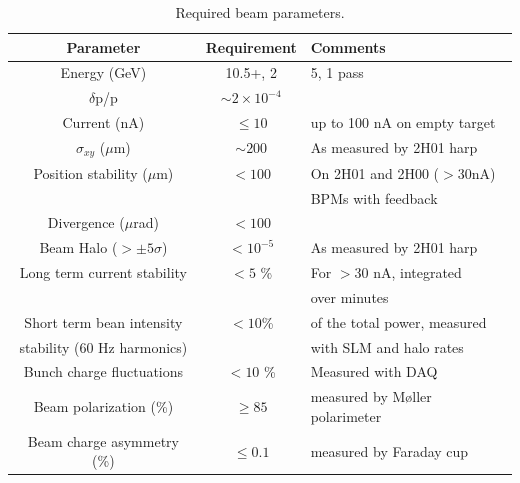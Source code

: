\documentclass[12pt]{article}
\begin{document}
 \begin{table}[htb]
\caption{Required beam parameters.}\label{tab:beam_par}
\centering
 \begin{tabular}{|c|c|l|}
\hline
Parameter & Requirement &Comments \\ \hline 
Energy (GeV) & 10.5+, 2   & 5, 1 pass  \\  \hline
$\delta$p/p & $\sim 2\times 10^{-4}$ & \\ \hline 
Current (nA) & $\le 10$ &up to 100 nA on empty target  \\  \hline
$\sigma_{xy}$ ($\mu$m) &$ \sim 200$& As measured by 2H01 harp \\ \hline 
Position stability ($\mu$m) & $< 100$ & On 2H01 and 2H00 ($>30$nA) \\ 
&&BPMs with feedback \\ \hline
Divergence ($\mu$rad) & $< 100$&  \\ \hline 
Beam Halo ($> \pm 5\sigma$) &$< 10^{-5}$&As measured by 2H01 harp \\ \hline
Long term current stability & $< 5$ \% & For $>30$ nA, integrated \\
&&over minutes \\ \hline 
Short term bean intensity & $<10$\%& of the total power, measured \\stability (60 Hz harmonics) && with SLM and halo rates \\ \hline
Bunch charge fluctuations &$< 10$ \% & Measured with DAQ \\ \hline
Beam polarization (\%)&$\ge 85$&measured by M\o{}ller polarimeter \\ \hline
Beam charge asymmetry (\%) &$\le 0.1$& measured by Faraday cup\\
\hline
 \end{tabular}
\end{table}
\end{document}
